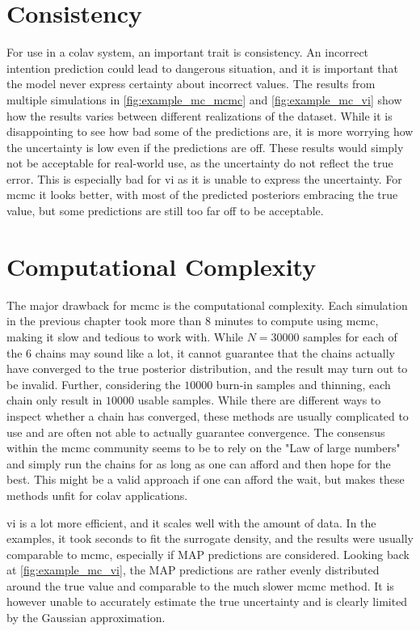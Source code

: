 \section{Consistency}
For use in a \acrshort{colav} system, an important trait is consistency. An incorrect intention prediction could lead to dangerous situation, and it is important that the model never express certainty about incorrect values. The results from multiple simulations in \cref{fig:example_mc_mcmc} and \cref{fig:example_mc_vi} show how the results varies between different realizations of the dataset. While it is disappointing to see how bad some of the predictions are, it is more worrying how the uncertainty is low even if the predictions are off. These results would simply not be acceptable for real-world use, as the uncertainty do not reflect the true error. This is especially bad for \acrshort{vi} as it is unable to express the uncertainty. For \acrshort{mcmc} it looks better, with most of the predicted posteriors embracing the true value, but some predictions are still too far off to be acceptable. 

\section{Computational Complexity}
The major drawback for \acrshort{mcmc} is the computational complexity. Each simulation in the previous chapter took more than 8 minutes to compute using \acrshort{mcmc}, making it slow and tedious to work with. While $N=30000$ samples for each of the $6$ chains may sound like a lot, it cannot guarantee that the chains actually have converged to the true posterior distribution, and the result may turn out to be invalid. Further, considering the $10000$ burn-in samples and thinning, each chain only result in $10000$ usable samples. While there are different ways to inspect whether a chain has converged, these methods are usually complicated to use and are often not able to actually guarantee convergence. The consensus within the \acrshort{mcmc} community seems to be to rely on the "Law of large numbers" and simply run the chains for as long as one can afford and then hope for the best. This might be a valid approach if one can afford the wait, but makes these methods unfit for \acrshort{colav} applications.  

\acrshort{vi} is a lot more efficient, and it scales well with the amount of data. In the examples, it took seconds to fit the surrogate density, and the results were usually comparable to \acrshort{mcmc}, especially if MAP predictions are considered. Looking back at \cref{fig:example_mc_vi}, the MAP predictions are rather evenly distributed around the true value and comparable to the much slower \acrshort{mcmc} method. It is however unable to accurately estimate the true uncertainty and is clearly limited by the Gaussian approximation.    


